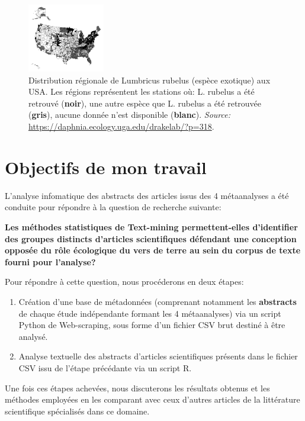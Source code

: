 \documentclass{book}
\begin{document}
\begin{figure}[htb] %
    \begin{center} %
        \includegraphics[width=0.3\textwidth]{worm-map.png}
        \caption[Distribution régionale de Lumbricus rubelus (espèce exotique) aux USA.]{Distribution régionale de Lumbricus rubelus (espèce exotique) aux USA. Les régions représentent les stations où: L. rubelus a été retrouvé (\textbf{noir}), une autre espèce que L. rubelus a été retrouvée (\textbf{gris}), aucune donnée n'est disponible (\textbf{blanc}).  \textit{Source:} \url{https://daphnia.ecology.uga.edu/drakelab/?p=318}.}\label{fig_wormmap}
    \end{center} 
\end{figure}

\section{Objectifs de mon travail}

\noindent
L'analyse infomatique des abstracts des articles issus des 4 métaanalyses a été conduite pour répondre à la question de recherche suivante:


\vspace{\baselineskip}
\noindent
\textbf{Les méthodes statistiques de Text-mining permettent-elles d'identifier des groupes distincts d'articles scientifiques défendant une conception opposée du rôle écologique du vers de terre au sein du corpus de texte fourni pour l'analyse?}

\vspace{\baselineskip}
Pour répondre à cette question, nous procéderons en deux étapes: 
\begin{enumerate}
    \item Création d'une base de métadonnées (comprenant notamment les \textbf{abstracts} de chaque étude indépendante formant les 4 métaanalyses) via un script Python de Web-scraping, sous forme d'un fichier CSV brut destiné à être analysé.
    \item Analyse textuelle des abstracts d'articles scientifiques présents dans le fichier CSV issu de l'étape précédante via un script R.
\end{enumerate}
\vspace{\baselineskip}
Une fois ces étapes achevées, nous discuterons les résultats obtenus et les méthodes employées en les comparant avec ceux d'autres articles de la littérature scientifique spécialisés dans ce domaine.
\thispagestyle{fancy}
\end{document}
